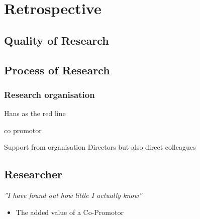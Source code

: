 \chapter{Retrospective}
\label{ch:retrospective}

\section{Quality of Research}

\section{Process of Research}

\subsection{Research organisation}

Hans as the red line

co promotor

Support from organisation
Directors but also direct colleagues



\section{Researcher}

\begin{center}
\textit{''I have found out how little I actually know''}
\end{center}

\begin{itemize}
	\item{The added value of a Co-Promotor}
\end{itemize}